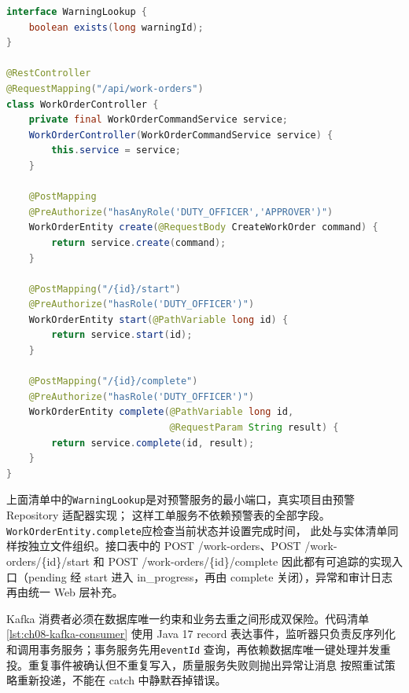 \begin{lstlisting}[label={lst:ch08-workorder-chain},language=Java,caption={工单创建与完成的后端链}]
interface WarningLookup {
    boolean exists(long warningId);
}

@RestController
@RequestMapping("/api/work-orders")
class WorkOrderController {
    private final WorkOrderCommandService service;
    WorkOrderController(WorkOrderCommandService service) {
        this.service = service;
    }

    @PostMapping
    @PreAuthorize("hasAnyRole('DUTY_OFFICER','APPROVER')")
    WorkOrderEntity create(@RequestBody CreateWorkOrder command) {
        return service.create(command);
    }

    @PostMapping("/{id}/start")
    @PreAuthorize("hasRole('DUTY_OFFICER')")
    WorkOrderEntity start(@PathVariable long id) {
        return service.start(id);
    }

    @PostMapping("/{id}/complete")
    @PreAuthorize("hasRole('DUTY_OFFICER')")
    WorkOrderEntity complete(@PathVariable long id,
                             @RequestParam String result) {
        return service.complete(id, result);
    }
}
\end{lstlisting}

上面清单中的\texttt{WarningLookup}是对预警服务的最小端口，真实项目由预警 Repository 适配器实现；
这样工单服务不依赖预警表的全部字段。\texttt{WorkOrderEntity.complete}应检查当前状态并设置完成时间，
此处与实体清单同样按独立文件组织。接口表中的 POST /work-orders、POST /work-orders/\{id\}/start 和 POST /work-orders/\{id\}/complete
因此都有可追踪的实现入口（pending 经 start 进入 in\_progress，再由 complete 关闭），异常和审计日志再由统一 Web 层补充。

Kafka 消费者必须在数据库唯一约束和业务去重之间形成双保险。代码清单\ref{lst:ch08-kafka-consumer}
使用 Java 17 record 表达事件，监听器只负责反序列化和调用事务服务；事务服务先用\texttt{eventId}
查询，再依赖数据库唯一键处理并发重投。重复事件被确认但不重复写入，质量服务失败则抛出异常让消息
按照重试策略重新投递，不能在 catch 中静默吞掉错误。

